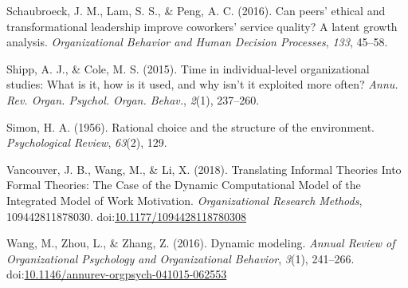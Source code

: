 \documentclass[english,,man]{apa6}
\theoremstyle{definition}
\theoremstyle{definition}
\theoremstyle{definition}
\theoremstyle{remark}
\begin{document}
\leavevmode\hypertarget{ref-schaubroeck_can_2016}{}%
Schaubroeck, J. M., Lam, S. S., \& Peng, A. C. (2016). Can peers'
ethical and transformational leadership improve coworkers' service
quality? A latent growth analysis. \emph{Organizational Behavior and
Human Decision Processes}, \emph{133}, 45--58.

\leavevmode\hypertarget{ref-shipp_time_2015}{}%
Shipp, A. J., \& Cole, M. S. (2015). Time in individual-level
organizational studies: What is it, how is it used, and why isn't it
exploited more often? \emph{Annu. Rev. Organ. Psychol. Organ. Behav.},
\emph{2}(1), 237--260.

\leavevmode\hypertarget{ref-simon1956rational}{}%
Simon, H. A. (1956). Rational choice and the structure of the
environment. \emph{Psychological Review}, \emph{63}(2), 129.

\leavevmode\hypertarget{ref-vancouver_translating_2018}{}%
Vancouver, J. B., Wang, M., \& Li, X. (2018). Translating Informal
Theories Into Formal Theories: The Case of the Dynamic Computational
Model of the Integrated Model of Work Motivation. \emph{Organizational
Research Methods}, 109442811878030.
doi:\href{https://doi.org/10.1177/1094428118780308}{10.1177/1094428118780308}

\leavevmode\hypertarget{ref-Wang2016}{}%
Wang, M., Zhou, L., \& Zhang, Z. (2016). Dynamic modeling. \emph{Annual
Review of Organizational Psychology and Organizational Behavior},
\emph{3}(1), 241--266.
doi:\href{https://doi.org/10.1146/annurev-orgpsych-041015-062553}{10.1146/annurev-orgpsych-041015-062553}
\end{document}
